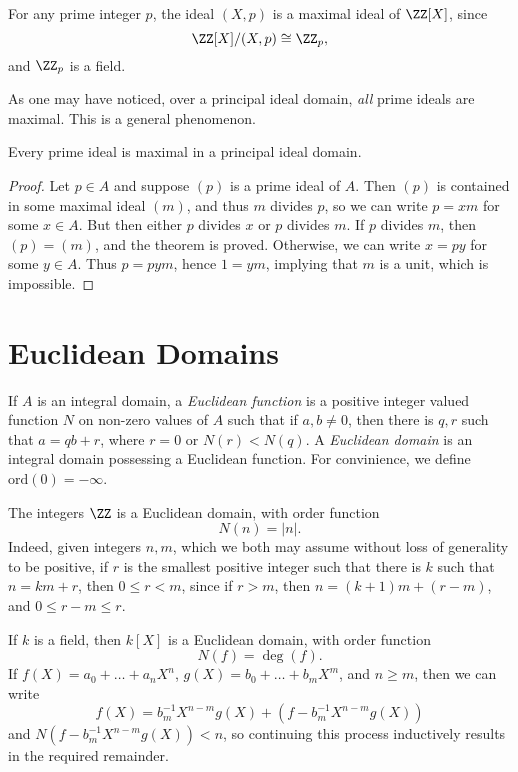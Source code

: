 \begin{example}
    For any prime integer $p$, the ideal $(X,p)$ is a maximal ideal of $\ZZ[X]$, since
    \[ \ZZ[X]/(X,p) \cong \ZZ_p, \]
    and $\ZZ_p$ is a field.
\end{example}

As one may have noticed, over a principal ideal domain, \emph{all} prime ideals are maximal. This is a general phenomenon.

\begin{theorem}
    Every prime ideal is maximal in a principal ideal domain.
\end{theorem}
\begin{proof}
    Let $p \in A$ and suppose $(p)$ is a prime ideal of $A$. Then $(p)$ is contained in some maximal ideal $(m)$, and thus $m$ divides $p$, so we can write $p = xm$ for some $x \in A$. But then either $p$ divides $x$ or $p$ divides $m$. If $p$ divides $m$, then $(p) = (m)$, and the theorem is proved. Otherwise, we can write $x = py$ for some $y \in A$. Thus $p = pym$, hence $1 = ym$, implying that $m$ is a unit, which is impossible.
\end{proof}

\section{Euclidean Domains}

If $A$ is an integral domain, a \emph{Euclidean function} is a positive integer valued function $N$ on non-zero values of $A$ such that if $a,b \neq 0$, then there is $q,r$ such that $a = qb + r$, where $r = 0$ or $N(r) < N(q)$. A \emph{Euclidean domain} is an integral domain possessing a Euclidean function. For convinience, we define $\text{ord}(0) = -\infty$.

\begin{example}
    The integers $\ZZ$ is a Euclidean domain, with order function
    \[ N(n) = |n|. \]
    Indeed, given integers $n,m$, which we both may assume without loss of generality to be positive, if $r$ is the smallest positive integer such that there is $k$ such that $n = km + r$, then $0 \leq r < m$, since if $r > m$, then $n = (k+1)m + (r - m)$, and $0 \leq r-m \leq r$.
\end{example}

\begin{example}
    If $k$ is a field, then $k[X]$ is a Euclidean domain, with order function
    \[ N(f) = \deg(f). \]
    If $f(X) = a_0 + \dots + a_nX^n$, $g(X) = b_0 + \dots + b_mX^m$, and $n \geq m$, then we can write
    \[ f(X) = b_m^{-1} X^{n-m} g(X) + (f - b_m^{-1} X^{n-m}g(X)) \]
    and $N(f - b_m^{-1} X^{n-m}g(X)) < n$, so continuing this process inductively results in the required remainder.
\end{example}

